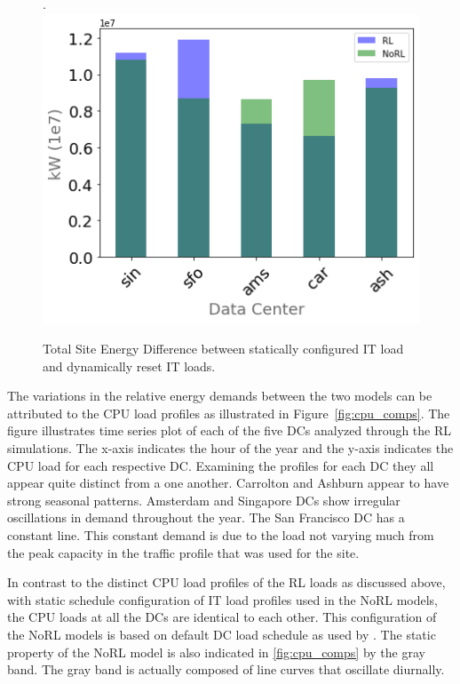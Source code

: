 \begin{figure}.
  \centering
  \includegraphics[scale=0.45]{img/total_energy_comp.png}
  \caption{Total Site Energy Difference between statically configured IT load and dynamically reset IT loads.}
  \label{fig:total_energy_comp}
  \end{figure}

The variations in the relative energy demands between the two models can be attributed to the CPU load profiles as illustrated in Figure~\ref{fig:cpu_comps}. The figure illustrates time series plot of each of the five DCs analyzed through the RL simulations. The x-axis indicates the hour of the year and the y-axis indicates the CPU load for each respective DC. Examining the profiles for each DC they all appear quite distinct from a one another. Carrolton and Ashburn appear to have strong seasonal patterns. Amsterdam and Singapore DCs show irregular oscillations in demand throughout the year. The San Francisco DC has a constant line. This constant demand is due to the load not varying much from the peak capacity in the traffic profile that was used for the site. 

In contrast to the distinct CPU load profiles of the RL loads as discussed above, with static schedule configuration of IT load profiles used in the NoRL models, the CPU loads at all the DCs are identical to each other. This configuration of the NoRL models is based on default DC load schedule as used by \citep{moriyama18}. The static property of the NoRL model is also indicated in \ref{fig:cpu_comps} by the gray band. The gray band is actually composed of line curves that oscillate diurnally.


